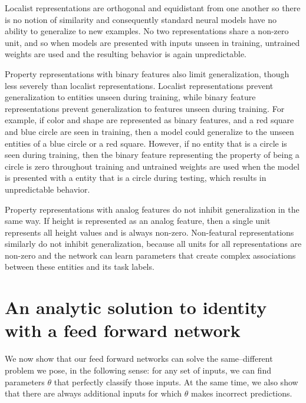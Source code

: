 Localist representations are orthogonal and equidistant from one another so there is no notion of similarity and consequently standard neural models have no ability to generalize to new examples. No two representations share a non-zero unit, and so when models are presented with inputs unseen in training, untrained weights are used and the resulting behavior is again unpredictable.

Property representations with binary features also limit generalization, though less severely than localist representations. Localist representations prevent generalization to entities unseen during training, while binary feature representations prevent generalization to features unseen during training. For example, if color and shape are represented as binary features, and a red square and blue circle are seen in training, then a model could generalize to the unseen entities of a blue circle or a red square. However, if no entity that is a circle is seen during training, then the binary feature representing the property of being a circle is zero throughout training and untrained weights are used when the model is presented with a entity that is a circle during testing, which results in unpredictable behavior.

Property representations with analog features do not inhibit generalization in the same way. If height is represented as an analog feature, then a single unit represents all height values and is always non-zero. Non-featural representations similarly do not inhibit generalization, because all units for all representations are non-zero and the network can learn parameters that create complex associations between these entities and its task labels.


\section{An analytic solution to identity with a feed forward network}\label{app:equality-solution}

We now show that our feed forward networks can solve the same--different problem we pose, in the following sense: for any set of inputs, we can find parameters $\theta$ that perfectly classify those inputs. At the same time, we also show that there are always additional inputs for which $\theta$ makes incorrect predictions.

